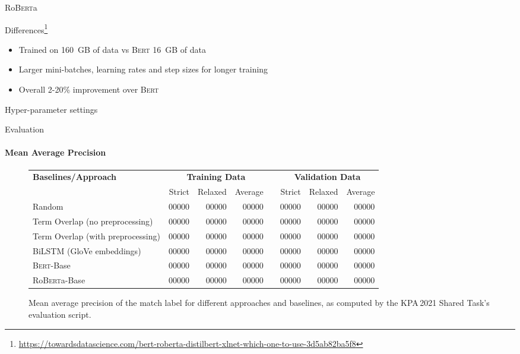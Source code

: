 \documentclass[english,handout]{mlutalk}
\newcommand{\Bert}{\textsc{Bert}\xspace}
\newcommand{\BertBase}{\Bert-Base\xspace}
\newcommand{\Roberta}{\mbox{Ro\textsc{Bert}a}\xspace}
\newcommand{\RobertaBase}{\Roberta-Base\xspace}
\begin{document}
\begin{frame}{\Roberta}
  \begin{block}{Differences\footnote{\scriptsize\url{https://towardsdatascience.com/bert-roberta-distilbert-xlnet-which-one-to-use-3d5ab82ba5f8}}}
    \begin{itemize}
      \item Trained on 160~GB of data vs \Bert 16~GB of data
      \item Larger mini-batches, learning rates and step sizes for longer training
      \item Overall 2-20\% improvement over \Bert
    \end{itemize}
  \end{block}

  \begin{block}{Hyper-parameter settings}
    
  \end{block}
\end{frame}

\begin{frame}{Evaluation}
  \framesubtitle{Mean Average Precision}
  \begin{figure}
    \centering
    \caption{Mean average precision of the match label for different approaches and baselines, as computed by the KPA\,2021 Shared Task's evaluation script.}
    \tiny
    \begin{tabular}{lrrrlrrr}
      \toprule
      \textbf{Baselines/Approach} & \multicolumn{3}{c}{\textbf{Training Data}} & & \multicolumn{3}{c}{\textbf{Validation Data}}\\ \cmidrule{2-4} \cmidrule{6-8}
        & Strict & Relaxed & Average & & Strict & Relaxed & Average\\
      \midrule
      Random 
      & 00000 & 00000 & 00000 & & 00000 & 00000 & 00000 \\
      Term Overlap (no preprocessing)
      & 00000 & 00000 & 00000 & & 00000 & 00000 & 00000 \\
      Term Overlap (with preprocessing)
      & 00000 & 00000 & 00000 & & 00000 & 00000 & 00000 \\
      \midrule
      BiLSTM (GloVe embeddings)
      & 00000 & 00000 & 00000 & & 00000 & 00000 & 00000 \\
      \BertBase
      & 00000 & 00000 & 00000 & & 00000 & 00000 & 00000 \\
      \RobertaBase
      & 00000 & 00000 & 00000 & & 00000 & 00000 & 00000 \\
      \bottomrule
    \end{tabular}
  \end{figure}
\end{frame}
\end{document}

